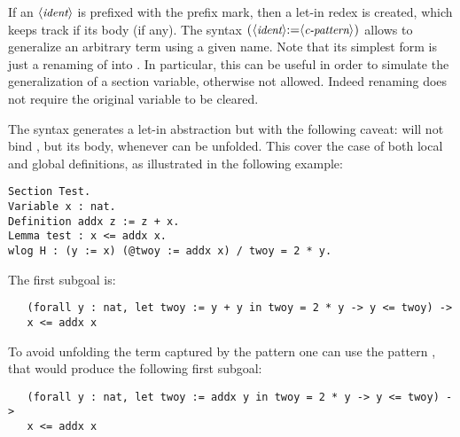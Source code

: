 \noindent
If an $\langle\mbox{\itshape\rmfamily\small ident}\rangle$ is prefixed with the  prefix mark, then a
let-in redex is created, which keeps track if its body (if any). The
syntax $\C{(}\N{ident}\C{:=}\N{c-pattern}\C{)}$ allows to
generalize an arbitrary term using a given name.  Note that its simplest
form  is just a renaming of  into . In
particular, this can be useful in order to simulate the generalization
of a section variable, otherwise not allowed. Indeed renaming does not
require the original variable to be cleared.


\noindent
The syntax  generates a let-in abstraction but with the following
caveat:  will not bind , but its body, whenever  can be
unfolded. This cover the case of both local and global definitions, as
illustrated in the following example:

\begin{lstlisting}
Section Test.
Variable x : nat.
Definition addx z := z + x.
Lemma test : x <= addx x.
wlog H : (y := x) (@twoy := addx x) / twoy = 2 * y.
\end{lstlisting}
\noindent
The first subgoal is:
\begin{lstlisting}
   (forall y : nat, let twoy := y + y in twoy = 2 * y -> y <= twoy) ->
   x <= addx x
\end{lstlisting}
\noindent
To avoid unfolding the term captured by the pattern  one
can use the pattern , that would produce the following first
subgoal:
\begin{lstlisting}
   (forall y : nat, let twoy := addx y in twoy = 2 * y -> y <= twoy) ->
   x <= addx x
\end{lstlisting}
